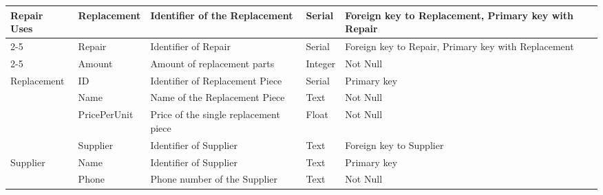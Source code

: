 \begin{longtable}{|p{}|p{} |p{}|p{}|p{} |}
\multirow{4}{*}{Repair Uses} 
    & Replacement & Identifier of the Replacement & Serial & Foreign key to Replacement, Primary key with Repair\\\cline{2-5}
    & Repair & Identifier of Repair & Serial & Foreign key to Repair, Primary key with Replacement\\\cline{2-5}
    & Amount & Amount of replacement parts & Integer & Not Null \\\hline

\multirow{4}{*}{Replacement} 
    & ID & Identifier of Replacement Piece & Serial & Primary key\\\cline{2-5}
    & Name & Name of the Replacement Piece & Text & Not Null\\\cline{2-5}
    & PricePerUnit & Price of the single replacement piece & Float & Not Null \\\cline{2-5}
    & Supplier & Identifier of Supplier & Text & Foreign key to Supplier\\\hline

\multirow{2}{*}{Supplier} 
    & Name & Identifier of Supplier & Text & Primary key \\\cline{2-5}
    & Phone & Phone number of the Supplier & Text & Not Null \\\hline



\end{longtable}